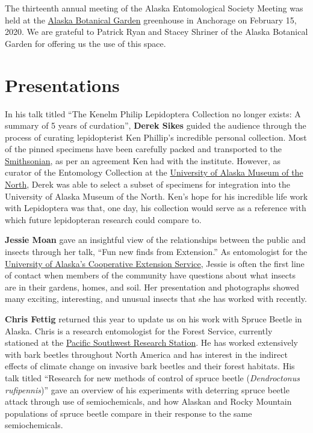 \begin{multicols}{2}

The thirteenth annual meeting of the Alaska Entomological Society Meeting was held at the \href{https://www.alaskabg.org/}{Alaska Botanical Garden} greenhouse in Anchorage on February 15, 2020. We are grateful to Patrick Ryan and Stacey Shriner of the Alaska Botanical Garden for offering us the use of this space. 

\section{Presentations}

In his talk titled ``The Kenelm Philip Lepidoptera Collection no longer exists: A summary of 5 years of curdation'', \textbf{Derek Sikes} guided the audience through the process of curating lepidopterist Ken Phillip’s incredible personal collection. Most of the pinned specimens have been carefully packed and transported to the \href{https://www.si.edu/}{Smithsonian}, as per an agreement Ken had with the institute. However, as curator of the Entomology Collection at the \href{https://www.uaf.edu/museum/}{University of Alaska Museum of the North}, Derek was able to select a subset of specimens for integration into the University of Alaska Museum of the North. Ken’s hope for his incredible life work with Lepidoptera was that, one day, his collection would serve as a reference with which future lepidopteran research could compare to.

\textbf{Jessie Moan} gave an insightful view of the relationships between the public and insects through her talk, ``Fun new finds from Extension.'' As entomologist for the \href{https://www.uaf.edu/ces/}{University of Alaska’s Cooperative Extension Service}, Jessie is often the first line of contact when members of the community have questions about what insects are in their gardens, homes, and soil. Her presentation and photographs showed many exciting, interesting, and unusual insects that she has worked with recently. 
 
\textbf{Chris Fettig} returned this year to update us on his work with Spruce Beetle in Alaska. Chris is a research entomologist for the  Forest Service, currently stationed at the \href{https://www.fs.fed.us/psw/}{Pacific Southwest Research Station}. He has worked extensively with bark beetles throughout North America and has interest in the indirect effects of climate change on invasive bark beetles and their forest habitats. His talk titled ``Research for new methods of control of spruce beetle (\textit{Dendroctonus rufipennis})'' gave an overview of his experiments with deterring spruce beetle attack through use of semiochemicals, and how Alaskan and Rocky Mountain populations of spruce beetle compare in their response to the same semiochemicals.


\end{multicols}
